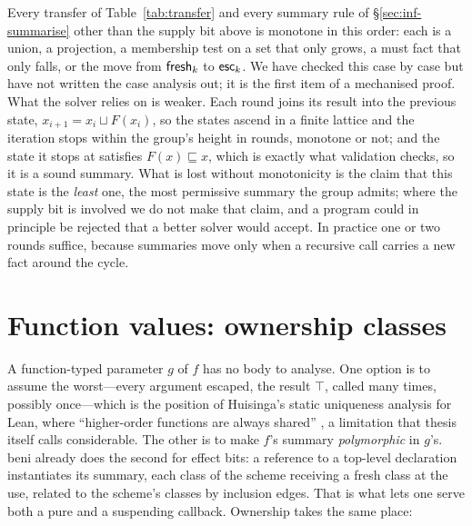 Every transfer of Table~\ref{tab:transfer} and every summary rule of \S\ref{sec:inf-summarise} other than
the supply bit above is monotone in this order: each is a union, a projection, a membership test on a set
that only grows, a must fact that only falls, or the move from $\mathsf{fresh}_k$ to $\mathsf{esc}_k$. We have checked this
case by case but have not written the case analysis out; it is the first item of a mechanised proof. What
the solver relies on is weaker. Each round joins its result into the previous state, $x_{i+1} = x_i \sqcup
F(x_i)$, so the states ascend in a finite lattice and the iteration stops within the group's height in
rounds, monotone or not; and the state it stops at satisfies $F(x) \sqsubseteq x$, which is exactly what
validation checks, so it is a sound summary. What is lost without monotonicity is the claim that this
state is the \emph{least} one, the most permissive summary the group admits; where the supply bit is
involved we do not make that claim, and a program could in principle be rejected that a better solver
would accept. In practice one or two rounds suffice, because summaries move only when a recursive call
carries a new fact around the cycle.

\section{Function values: ownership classes}
\label{sec:inf-classes}

A function-typed parameter $g$ of $f$ has no body to analyse. One option is to assume the worst---every
argument escaped, the result $\top$, called many times, possibly once---which is the position of
Huisinga's static uniqueness analysis for Lean, where ``higher-order functions are always shared''
\citep[\S4.1]{huisinga2023lean}, a limitation that thesis itself calls considerable. The other is to
make $f$'s summary \emph{polymorphic} in $g$'s. beni already does the second for effect bits: a
reference to a top-level declaration instantiates its summary, each class of the scheme receiving a
fresh class at the use, related to the scheme's classes by inclusion edges. That is what lets one
 serve both a pure and a suspending callback. Ownership takes the same place:

